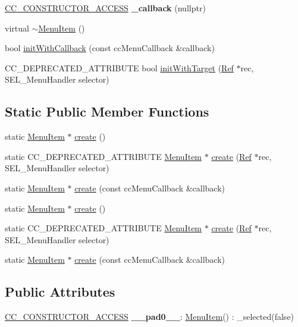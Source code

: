\begin{DoxyCompactItemize}
\hyperlink{_2cocos2d_2cocos_2base_2ccConfig_8h_a25ef1314f97c35a2ed3d029b0ead6da0}{C\+C\+\_\+\+C\+O\+N\+S\+T\+R\+U\+C\+T\+O\+R\+\_\+\+A\+C\+C\+E\+SS} {\bfseries \+\_\+callback} (nullptr)
\item 
virtual \hyperlink{classMenuItem_a6aee8c9035c65c1ffc28b5d0f2a6c00f}{$\sim$\+Menu\+Item} ()
\item 
bool \hyperlink{classMenuItem_a15599490c1ba216f1a87394b798859dd}{init\+With\+Callback} (const cc\+Menu\+Callback \&callback)
\item 
C\+C\+\_\+\+D\+E\+P\+R\+E\+C\+A\+T\+E\+D\+\_\+\+A\+T\+T\+R\+I\+B\+U\+TE bool \hyperlink{classMenuItem_a0030ed4ade25f001737c32cc5f694a52}{init\+With\+Target} (\hyperlink{classRef}{Ref} $\ast$rec, S\+E\+L\+\_\+\+Menu\+Handler selector)
\end{DoxyCompactItemize}
\subsection*{Static Public Member Functions}
\begin{DoxyCompactItemize}
\item 
static \hyperlink{classMenuItem}{Menu\+Item} $\ast$ \hyperlink{classMenuItem_a241257e98f27222a37ea03e40971c066}{create} ()
\item 
static C\+C\+\_\+\+D\+E\+P\+R\+E\+C\+A\+T\+E\+D\+\_\+\+A\+T\+T\+R\+I\+B\+U\+TE \hyperlink{classMenuItem}{Menu\+Item} $\ast$ \hyperlink{classMenuItem_a3d78c2702e72a51501f2d4e14d15f49e}{create} (\hyperlink{classRef}{Ref} $\ast$rec, S\+E\+L\+\_\+\+Menu\+Handler selector)
\item 
static \hyperlink{classMenuItem}{Menu\+Item} $\ast$ \hyperlink{classMenuItem_a866e2fb9b3b84c9f0b89e3d328fd9c41}{create} (const cc\+Menu\+Callback \&callback)
\item 
static \hyperlink{classMenuItem}{Menu\+Item} $\ast$ \hyperlink{classMenuItem_a2b8f48a8ba454d73ecd6ee74a0486a00}{create} ()
\item 
static C\+C\+\_\+\+D\+E\+P\+R\+E\+C\+A\+T\+E\+D\+\_\+\+A\+T\+T\+R\+I\+B\+U\+TE \hyperlink{classMenuItem}{Menu\+Item} $\ast$ \hyperlink{classMenuItem_acad3900be8eebce65a8c737184d22d88}{create} (\hyperlink{classRef}{Ref} $\ast$rec, S\+E\+L\+\_\+\+Menu\+Handler selector)
\item 
static \hyperlink{classMenuItem}{Menu\+Item} $\ast$ \hyperlink{classMenuItem_a4ca5b194b8fc96a60ae7f3bb29c22a4c}{create} (const cc\+Menu\+Callback \&callback)
\end{DoxyCompactItemize}
\subsection*{Public Attributes}
\begin{DoxyCompactItemize}
\item 
\mbox{\label{classMenuItem_a6ff5318c12eab569ecb2557d2b9a47ee}} 
\hyperlink{_2cocos2d_2cocos_2base_2ccConfig_8h_a25ef1314f97c35a2ed3d029b0ead6da0}{C\+C\+\_\+\+C\+O\+N\+S\+T\+R\+U\+C\+T\+O\+R\+\_\+\+A\+C\+C\+E\+SS} {\bfseries \+\_\+\+\_\+pad0\+\_\+\+\_\+}\+: \hyperlink{classMenuItem}{Menu\+Item}() \+: \+\_\+selected(false)
\end{DoxyCompactItemize}
